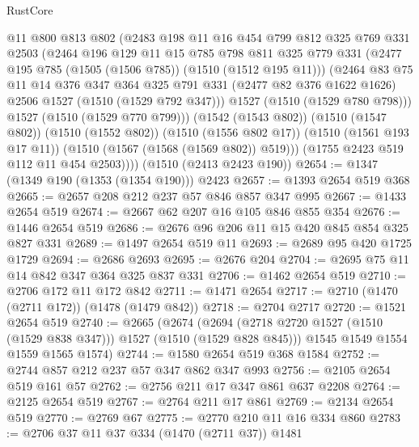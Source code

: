 \begin{lexlean}{RustCore}
\begin{coremodule}
            @11
            @800
            @813
            @802
            (@2483
              @198
              @11
              @16
              @454
              @799
              @812
              @325
              @769
              @331
              @2503
              (@2464
                @196
                @129
                @11
                @15
                @785
                @798
                @811
                @325
                @779
                @331
                (@2477 @195 @785 (@1505 (@1506 @785)) (@1510 (@1512 @195 @11)))
                (@2464
                  @83
                  @75
                  @11
                  @14
                  @376
                  @347
                  @364
                  @325
                  @791
                  @331
                  (@2477 @82 @376 @1622 @1626)
                  @2506
                  @1527
                  (@1510 (@1529 @792 @347)))
                @1527
                (@1510 (@1529 @780 @798)))
              @1527
              (@1510 (@1529 @770 @799)))
            (@1542 (@1543 @802))
            (@1510 (@1547 @802))
            (@1510 (@1552 @802))
            (@1510 (@1556 @802 @17))
            (@1510 (@1561 @193 @17 @11))
            (@1510 (@1567 (@1568 (@1569 @802)) @519)))
          (@1755 @2423 @519 @112 @11 @454 @2503))))
    (@1510 (@2413 @2423 @190))
@2654 := @1347 (@1349 @190 (@1353 (@1354 @190))) @2423
@2657 := @1393 @2654 @519 @368
@2665 := @2657 @208 @212 @237 @57 @846 @857 @347 @995
@2667 := @1433 @2654 @519
@2674 := @2667 @62 @207 @16 @105 @846 @855 @354
@2676 := @1446 @2654 @519
@2686 := @2676 @96 @206 @11 @15 @420 @845 @854 @325 @827 @331
@2689 := @1497 @2654 @519 @11
@2693 := @2689 @95 @420 @1725 @1729
@2694 := @2686 @2693
@2695 := @2676 @204
@2704 := @2695 @75 @11 @14 @842 @347 @364 @325 @837 @331
@2706 := @1462 @2654 @519
@2710 := @2706 @172 @11 @172 @842
@2711 := @1471 @2654
@2717 := @2710 (@1470 (@2711 @172)) (@1478 (@1479 @842))
@2718 := @2704 @2717
@2720 := @1521 @2654 @519
@2740 := @2665
    (@2674
      (@2694 (@2718 @2720 @1527 (@1510 (@1529 @838 @347))) @1527 (@1510 (@1529 @828 @845)))
      @1545
      @1549
      @1554
      @1559
      @1565
      @1574)
@2744 := @1580 @2654 @519 @368 @1584
@2752 := @2744 @857 @212 @237 @57 @347 @862 @347 @993
@2756 := @2105 @2654 @519 @161 @57
@2762 := @2756 @211 @17 @347 @861 @637 @2208
@2764 := @2125 @2654 @519
@2767 := @2764 @211 @17 @861
@2769 := @2134 @2654 @519
@2770 := @2769 @67
@2775 := @2770 @210 @11 @16 @334 @860
@2783 := @2706 @37 @11 @37 @334 (@1470 (@2711 @37)) @1481

\end{coremodule}
\end{lexlean}

